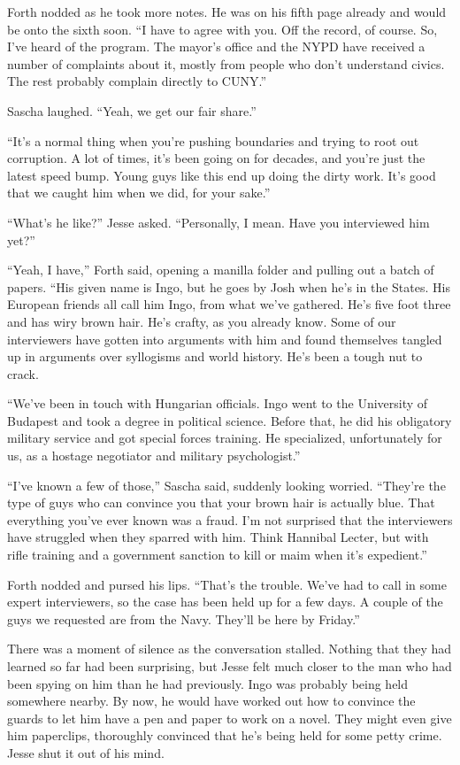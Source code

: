 \documentclass[12pt]{book}
\begin{document}
Forth nodded as he took more notes.  He was on his fifth page already and would be onto the sixth soon.  ``I have to agree with you.  Off the record, of course.  So, I've heard of the program.  The mayor's office and the NYPD have received a number of complaints about it, mostly from people who don't understand civics.  The rest probably complain directly to CUNY.''

Sascha laughed.  ``Yeah, we get our fair share.''

``It's a normal thing when you're pushing boundaries and trying to root out corruption.  A lot of times, it's been going on for decades, and you're just the latest speed bump.  Young guys like this end up doing the dirty work.  It's good that we caught him when we did, for your sake.''

``What's he like?'' Jesse asked.  ``Personally, I mean.  Have you interviewed him yet?''

``Yeah, I have,'' Forth said, opening a manilla folder and pulling out a batch of papers.  ``His given name is Ingo, but he goes by Josh when he's in the States.  His European friends all call him Ingo, from what we've gathered.  He's five foot three and has wiry brown hair.  He's crafty, as you already know.  Some of our interviewers have gotten into arguments with him and found themselves tangled up in arguments over syllogisms and world history.  He's been a tough nut to crack.

``We've been in touch with Hungarian officials.  Ingo went to the University of Budapest and took a degree in political science.  Before that, he did his obligatory military service and got special forces training.  He specialized, unfortunately for us, as a hostage negotiator and military psychologist.''

``I've known a few of those,'' Sascha said, suddenly looking worried.  ``They're the type of guys who can convince you that your brown hair is actually blue.  That everything you've ever known was a fraud.  I'm not surprised that the interviewers have struggled when they sparred with him.  Think Hannibal Lecter, but with rifle training and a government sanction to kill or maim when it's expedient.''

Forth nodded and pursed his lips.  ``That's the trouble.  We've had to call in some expert interviewers, so the case has been held up for a few days.  A couple of the guys we requested are from the Navy.  They'll be here by Friday.''

There was a moment of silence as the conversation stalled.  Nothing that they had learned so far had been surprising, but Jesse felt much closer to the man who had been spying on him than he had previously.  Ingo was probably being held somewhere nearby.  By now, he would have worked out how to convince the guards to let him have a pen and paper to work on a novel.  They might even give him paperclips, thoroughly convinced that he's being held for some petty crime.  Jesse shut it out of his mind.
\end{document}
